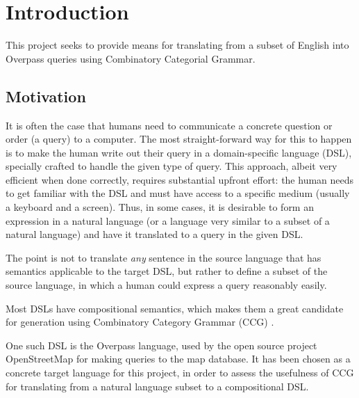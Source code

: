 \documentclass[main.tex]{subfiles}
\begin{document}
\section{Introduction}
This project seeks to provide means for translating from a subset of English
into Overpass queries using Combinatory Categorial Grammar.

\subsection{Motivation}
It is often the case that humans need to communicate a concrete question
or order (a query) to a computer. The most straight-forward way for this to happen is
to make the human write out their query in a domain-specific language (DSL),
specially crafted to handle the given type of query. This approach, albeit
very efficient when done correctly, requires substantial upfront effort:
the human needs to get familiar with the DSL and must have access to a specific
medium (usually a keyboard and a screen). Thus, in some cases, it is desirable
to form an expression in a natural language (or a language very similar to a
subset of a natural language) and have it translated to a query in the given
DSL.

The point is not to translate \emph{any} sentence in the source language
that has semantics applicable to the target DSL, but rather to define a
subset of the source language, in which a human could express a query
reasonably easily.

Most DSLs have compositional semantics, which makes them a great candidate
for generation using Combinatory Category Grammar (CCG) \cite[p.~181]{nts}.

One such DSL is the Overpass language, used by the open source project
OpenStreetMap for making queries to the map database. It has been chosen as
a concrete target language for this project, in order to assess the usefulness
of CCG for translating from a natural language subset to a compositional
DSL.
\end{document}
